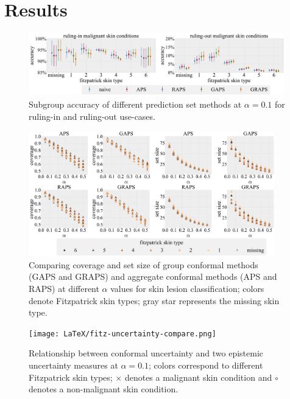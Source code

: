 \documentclass[letterpaper]{article} %
\begin{document}
\section{Results}

    \begin{figure}[t]
    \centering
    \includegraphics[width=0.99\textwidth]{LaTeX/fitz-rule-in-out-subgroup.pdf}
    \caption{Subgroup accuracy of different prediction set methods at $\alpha=0.1$ for ruling-in and ruling-out use-cases.}
    \label{fig:fitz-use-case}
    \end{figure}

    \begin{figure}[t]
    \centering
    \includegraphics[width=0.95\textwidth]{LaTeX/fitz-subgroup-coverage.pdf}
    \caption{Comparing coverage and set size of group conformal methods (GAPS and GRAPS) and aggregate conformal methods (APS and RAPS) at different $\alpha$ values for skin lesion classification; colors denote Fitzpatrick skin types; gray star represents the missing skin type.}
    \label{fig:fitz-coverage}
    \end{figure}

    \begin{figure}[t]
    \centering
    \texttt{[image: LaTeX/fitz-uncertainty-compare.png]}
    \caption{Relationship between conformal uncertainty and two epistemic uncertainty measures at $\alpha=0.1$; colors correspond to different Fitzpatrick skin types; $\times$ denotes a malignant skin condition and $\circ$ denotes a non-malignant skin condition.}
    \label{fig:epistemic-uncertainty}
    \end{figure}
\end{document}
